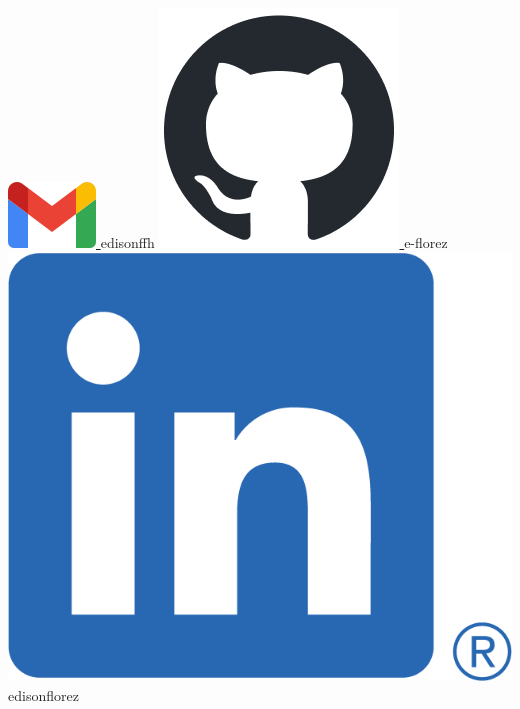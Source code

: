 \begin{center}
    \href{
        mailto:edisonffh@gmail.com
    }{
        \includegraphics[scale=0.25]{figs/gmail_icon.png}
    } edisonffh
    \hspace*{5mm}
    \href{
        https://github.com/e-florez
    }{
        \includegraphics[scale=0.3]{figs/github-mark.png}
    } e-florez
    \hspace*{5mm}
    \href{
        https://www.linkedin.com/in/edisonflorez/
    }{
        \includegraphics[scale=0.1]{figs/linkedin_bug.png}
    } edisonflorez
    \hspace*{5mm}

\end{center}
